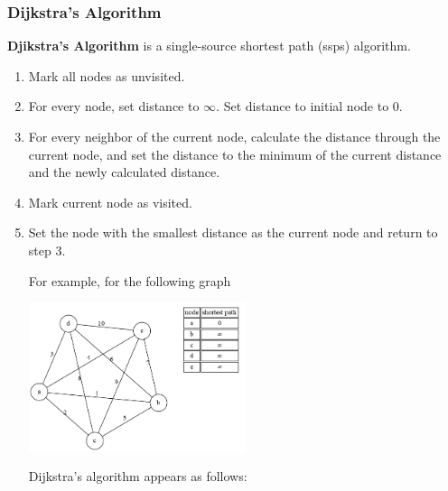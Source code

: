 \documentclass[a4paper]{article}
\theoremstyle{definition}
\begin{document}
\subsubsection{Dijkstra's Algorithm}
\textbf{Djikstra's Algorithm} is a single-source shortest path (ssps) algorithm. 
\begin{enumerate}
 \item Mark all nodes as unvisited. 
 \item For every node, set distance to $\infty$. Set distance to initial node to 0.
 \item For every neighbor of the current node, calculate the distance through the current node, and set the distance to the minimum of the current distance and the newly calculated distance.
 \item Mark current node as visited. 
 \item Set the node with the smallest distance as the current node and return to step 3.
 
 For example, for the following graph
 
 \begin{center}\includegraphics[width=0.5\textwidth]{graphs/shortest-path-trees/spt_1_0.png}\end{center}
 
 Dijkstra's algorithm appears as follows:


\end{enumerate}
\end{document}
